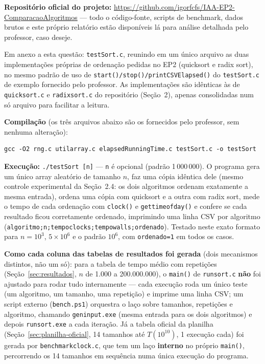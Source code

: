 \documentclass[11pt,a4paper]{article}
\newcommand{\segurl}[1]{\underline{\vphantom{Ag}#1}\hspace{0pt}}
\newcommand{\urlRepoOficial}{\href{https://github.com/igorfcfs/IAA-EP2-ComparacaoAlgoritmos}{\ttfamily\color{linkblue}\segurl{https://github.com/}\allowbreak\segurl{igorfcfs/}\allowbreak\segurl{IAA-EP2-ComparacaoAlgoritmos}}}
\newcommand{\barra}{/\allowbreak}
\renewcommand{\_}{\underscoreoriginal\allowbreak}
\begin{document}
\textbf{Repositório oficial do projeto:} \urlRepoOficial{} --- todo o
código-fonte, scripts de benchmark, dados brutos e este próprio relatório
estão disponíveis lá para análise detalhada pelo professor, caso deseje.

Em anexo a esta questão: \texttt{testSort.c}, reunindo em um único
arquivo as duas implementações próprias de ordenação pedidas no EP2
(quicksort e radix sort), no mesmo padrão de uso de
\texttt{start()\barra{}stop()\barra{}printCSVElapsed()} do
\texttt{testSort.c} de exemplo fornecido pelo professor. As
implementações são idênticas às de \texttt{quicksort.c} e
\texttt{radixsort.c} do repositório (Seção~2), apenas consolidadas num
só arquivo para facilitar a leitura.

\textbf{Compilação} (os três arquivos abaixo são os fornecidos pelo
professor, sem nenhuma alteração):
\begin{verbatim}
gcc -O2 rng.c utilarray.c elapsedRunningTime.c testSort.c -o testSort
\end{verbatim}

\textbf{Execução:} \texttt{./testSort [n]} --- \texttt{n} é opcional
(padrão 1\,000\,000). O programa gera um único array aleatório de
tamanho $n$, faz uma cópia idêntica dele (mesmo controle experimental da
Seção~2.4: os dois algoritmos ordenam exatamente a mesma entrada), ordena
uma cópia com quicksort e a outra com radix sort, mede o tempo de cada
ordenação com \texttt{clock()} e \texttt{gettimeofday()} e confere se
cada resultado ficou corretamente ordenado, imprimindo uma linha CSV por
algoritmo (\texttt{algoritmo;n;tempo\_clock\_s;tempo\_wall\_s;ordenado}).
Testado neste exato formato para $n=10^3$, $5\times10^6$ e o padrão
$10^6$, com \texttt{ordenado=1} em todos os casos.

\textbf{Como cada coluna das tabelas de resultados foi gerada} (dois
mecanismos distintos, não um só): para a tabela de tempo médio com
repetições (Seção~\ref{sec:resultados}, $n$ de 1.000 a 200.000.000), o
\texttt{main()} de \texttt{run\_sort.c} \textbf{não} foi ajustado para
rodar tudo internamente --- cada execução roda um único teste (um
algoritmo, um tamanho, uma repetição) e imprime uma linha CSV; um script
externo (\texttt{bench.ps1}) orquestra o laço sobre tamanhos, repetições
e algoritmo, chamando \texttt{gen\_input.exe} (mesma entrada para os dois
algoritmos) e depois \texttt{run\_sort.exe} a cada iteração. Já a tabela
oficial da planilha (Seção~\ref{sec:planilha-oficial}, 14 tamanhos até
$T(10^{10})$, 1 execução cada) foi gerada por \texttt{benchmark\_clock.c},
que tem um laço \textbf{interno} no próprio \texttt{main()}, percorrendo
os 14 tamanhos em sequência numa única execução do programa.
\end{document}
